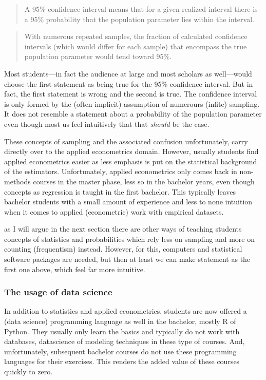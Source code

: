 \documentclass[fleqn,10pt]{SelfArx} %
\begin{document}
\begin{quotation}
  A 95\% confidence interval means that for a given realized interval there is a 95\% probability that the population parameter lies within the interval.
\end{quotation}

\begin{quotation}
  With numerous repeated samples, the fraction of calculated confidence intervals (which would differ for each sample) that encompass the true population parameter would tend toward 95\%.
\end{quotation}

Most students---in fact the audience at large and most scholars as well---would
choose the first statement as being true for the 95\% confidence interval. But
in fact, the first statement is wrong and the second is true. The confidence
interval is only formed by the (often implicit) assumption of numerours (infite)
sampling. It does not resemble a statement about a probability of the population
parameter even though most us feel intuitively that that \emph{should} be the
case.

These concepts of sampling and the associated confusion unfortunately,
carry directly over to the applied econometrics domain. However, usually
students find applied econometrics easier as less emphasis is put on the
statistical background of the estimators. Unfortunately, applied econometrics
only comes back in non-methods courses in the master phase, less so in the bachelor years,
even though concepts as regression is taught in the first bachelor. This
typically leaves bachelor students with a small amount of experience and less to none
intuition when it comes to applied (econometric) work with empirical datasets.   

as I will argue in the next section there are other ways of teaching students
concepts of statistics and probabilities which rely less on sampling and more on
counting (frequentism) instead. However, for this, computers and statistical
software packages are needed, but then at least we can make statement as the
first one above, which feel far more intuitive. 

\subsubsection{The usage of data science}

In addition to statistics and applied econometrics, students are now offered a
(data science) programming language as well in the
bachelor, mostly R of Python. They usually only learn the basics and typically
do not work with databases, datascience of modeling techniques in these type of
courses. And, unfortunately, subsequent bachelor courses do not use these programming
languages for their exercises. This renders the added value of these courses
quickly to zero.
\end{document}
